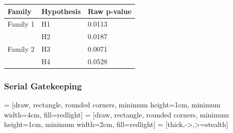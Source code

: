 \documentclass[xcolor={pdftex,dvipsnames,table}]{beamer}
\begin{document}
\begin{frame}

\begin{table}[]
\begin{tabular}{l|l|l}
\textbf{Family} & \textbf{Hypothesis} & \textbf{Raw p-value} \\ \hline
Family 1 & H1  & 0.0113  \\
   & H2  & 0.0187  \\
Family 2  & H3 & 0.0071               \\
  & H4  & 0.0528              
\end{tabular}
\end{table}    
\end{frame}

\begin{frame}
\frametitle{Serial Gatekeeping}
 = [draw, rectangle, rounded corners, minimum height=1cm, minimum width=4cm, fill=redlight]
 = [draw, rectangle, rounded corners, minimum height=1cm, minimum width=2cm, fill=redlight]
 = [thick,->,>=stealth]

\begin{figure}
\centering

\end{figure}

\end{frame}
\end{document}
